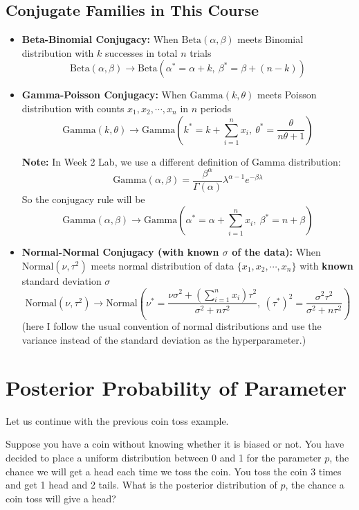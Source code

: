 \documentclass{article}
\begin{document}
\subsection{Conjugate Families in This Course}
\begin{itemize}
\item \textbf{Beta-Binomial Conjugacy:} When $\text{Beta}(\alpha, \beta)$ meets Binomial distribution with $k$ successes in total $n$ trials
$$ \text{Beta}(\alpha, \beta) \longrightarrow \text{Beta}(\alpha^* = \alpha+k,\ \beta^* =\beta+(n-k))$$

\item \textbf{Gamma-Poisson Conjugacy:} When $\text{Gamma}(k, \theta)$ meets Poisson distribution with counts ${x_1, x_2, \cdots, x_n}$ in $n$ periods
$$ \text{Gamma}(k, \theta) \longrightarrow \text{Gamma}\left(k^* = k+\sum_{i=1}^n x_i,\ \theta^* = \frac{\theta}{n\theta + 1}\right) $$

\textbf{Note:} In Week 2 Lab, we use a different definition of Gamma distribution:
$$ \text{Gamma}(\alpha, \beta) = \frac{\beta^\alpha}{\Gamma(\alpha)}\lambda^{\alpha-1}e^{-\beta\lambda} $$
So the conjugacy rule will be
$$ \text{Gamma}(\alpha, \beta) \longrightarrow \text{Gamma}(\alpha^* = \alpha + \sum_{i=1}^n x_i,\ \beta^* = n+\beta) $$

\item \textbf{Normal-Normal Conjugacy (with known $\sigma$ of the data):} When $\text{Normal}(\nu, \tau^2)$ meets normal distribution of data $\{x_1, x_2, \cdots, x_n\}$ with \textbf{known} standard deviation $\sigma$
$$ \text{Normal}(\nu, \tau^2) \longrightarrow \text{Normal}\left(\nu^*=\frac{\nu\sigma^2+(\sum_{i=1}^n x_i)\tau^2}{\sigma^2+n\tau^2},\ (\tau^*)^2 = \frac{\sigma^2\tau^2}{\sigma^2+n\tau^2}\right) $$
(here I follow the usual convention of normal distributions and use the variance instead of the standard deviation as the hyperparameter.)
\end{itemize}

\section{Posterior Probability of Parameter}

Let us continue with the previous coin toss example.

\begin{displayquote}
	Suppose you have a coin without knowing whether it is biased or not. You have decided to place a uniform distribution between 0 and 1 for the parameter $p$, the chance we will get a head each time we toss the coin. You toss the coin 3 times and get 1 head and 2 tails. What is the posterior distribution of $p$, the chance a coin toss will give a head?
\end{displayquote}
\end{document}
